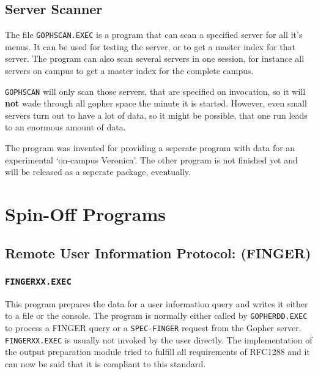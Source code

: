 \subsection{Server Scanner}

The file {\tt GOPHSCAN.EXEC} is a program that can scan a specified server
for all it's menus.  It can be used for testing the server, or to get a
master index for that server.  The program can also scan several servers
in one session, for instance all servers on campus to get a master index
for the complete campus.

{\tt GOPHSCAN} will only scan those servers, that are specified on
invocation, so it will {\bf not} wade through all gopher space the minute
it is started.  However, even small servers turn out to have a lot of data,
so it might be possible, that one run leads to an enormous amount of data.

The program was invented for providing a seperate program with data for an
experimental `on-campus Veronica'.  The other program is not finished yet
and will be released as a seperate package, eventually.




\section{Spin-Off Programs}



\subsection{Remote User Information Protocol: (FINGER)}




\subsubsection{{\tt FINGERXX.EXEC}}
 
  This program prepares the data for a user information query and writes
  it either to a file or the console.  The program is normally either
  called by {\tt GOPHERDD.EXEC} to process a FINGER query or 
  a {\tt SPEC-FINGER} request
  from the Gopher server.  {\tt FINGERXX.EXEC} is usually not
  invoked by the user directly.  The implementation
  of the output preparation module tried to fulfill all
  requirements of RFC1288 \cite{rfc1288}
  and it can now be said that it is compliant to this standard.
 
